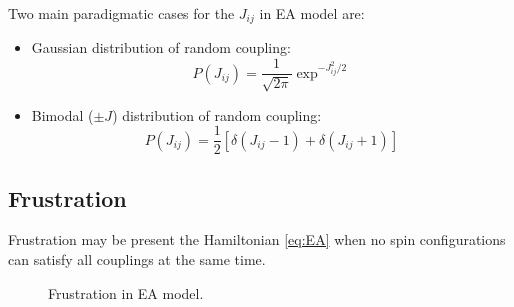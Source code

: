 Two main paradigmatic cases for the $J_{ij}$ in EA model are:
\begin{itemize}
\item Gaussian distribution of random coupling:
  \begin{equation}
    \label{eq:Jij_Gaussian}
    P(J_{ij})=\frac{1}{\sqrt{2\pi}}\exp^{-J_{ij}^2/2}
  \end{equation}
\item Bimodal ($\pm J$) distribution of random coupling:
  \begin{equation}
    \label{eq:Jij_bimodal}
    P(J_{ij})=\frac{1}{2}[\delta(J_{ij}-1)+\delta(J_{ij}+1)]
  \end{equation}
\end{itemize}

\subsection{Frustration}
\label{sec:frustration}
Frustration may be present the Hamiltonian \ref{eq:EA} when no spin 
configurations can satisfy all couplings at the same time. 

\begin{figure}
  \centering
  \hspace{0.5cm}
  \caption{Frustration in EA model.}
  \label{fig:frustration}
\end{figure}

